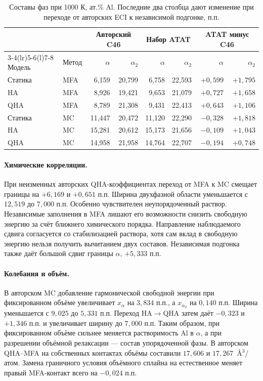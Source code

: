 \documentclass[11pt,a4paper]{article}
\begin{document}
\begin{table}[htbp]
\centering\small
\caption{Составы фаз при 1000 К, ат.\% Al. Последние два столбца дают
изменение при переходе от авторских ECI к независимой подгонке, п.п.}
\label{tab:ce-six}
\begin{tabular}{@{}llrr rr rr@{}}
\toprule
 & & \multicolumn{2}{c}{Авторский C46} &
 \multicolumn{2}{c}{Набор ATAT} & \multicolumn{2}{c}{ATAT минус C46}\\
\cmidrule(lr){3-4}\cmidrule(lr){5-6}\cmidrule(l){7-8}
Модель & Метод & \(\alpha\) & \(\alpha_2\) & \(\alpha\) & \(\alpha_2\)
 & \(\alpha\) & \(\alpha_2\)\\
\midrule
Статика & MFA & 6,159 & 20,799 & 6,758 & 22,593 & \(+0{,}599\) & \(+1{,}795\)\\
HA      & MFA & 8,926 & 19,421 & 9,653 & 21,079 & \(+0{,}727\) & \(+1{,}658\)\\
QHA     & MFA & 8,789 & 21,308 & 9,431 & 22,413 & \(+0{,}643\) & \(+1{,}106\)\\
\addlinespace
Статика & MC  & 11,447 & 20,472 & 11,120 & 22,290 & \(-0{,}328\) & \(+1{,}818\)\\
HA      & MC  & 15,281 & 20,612 & 15,173 & 21,656 & \(-0{,}109\) & \(+1{,}043\)\\
QHA     & MC  & 14,958 & 21,958 & 14,764 & 22,707 & \(-0{,}194\) & \(+0{,}748\)\\
\bottomrule
\end{tabular}
\end{table}

\paragraph{Химические корреляции.}
При неизменных авторских QHA-коэффициентах переход от MFA к MC смещает
границы на \(+6{,}169\) и \(+0{,}651\) п.п. Ширина двухфазной области
уменьшается с \(12{,}519\) до \(7{,}000\) п.п. Особенно чувствителен
неупорядоченный раствор. Независимые заполнения в MFA лишают его
возможности снизить свободную энергию за счёт ближнего химического
порядка. Направление наблюдаемого сдвига согласуется со стабилизацией
раствора, хотя сам вклад в свободную энергию нельзя получить вычитанием
двух составов. Независимая подгонка также даёт большой сдвиг границы
\(\alpha\), \(+5{,}333\) п.п.

\paragraph{Колебания и объём.}
В авторском MC добавление гармонической свободной энергии при фиксированном
объёме увеличивает \(x_\alpha\) на \(3{,}834\) п.п., а \(x_{\alpha_2}\)
на \(0{,}140\) п.п. Ширина уменьшается с \(9{,}025\) до \(5{,}331\) п.п.
Переход HA\(\to\)QHA затем даёт \(-0{,}323\) и \(+1{,}346\) п.п.
и увеличивает ширину до \(7{,}000\) п.п. Таким образом, при фиксированном
объёме сильнее меняется растворимость Al в \(\alpha\), а при разрешении
объёмной релаксации --- состав упорядоченной фазы. В авторском QHA--MFA
на собственных контактах объёмы составили \(17{,}606\) и
\(17{,}267\)~\AA$^3$/атом. Замена граничного условия объёмного сплайна
на естественное меняет правый MFA-контакт всего на \(-0{,}024\) п.п.
\end{document}
